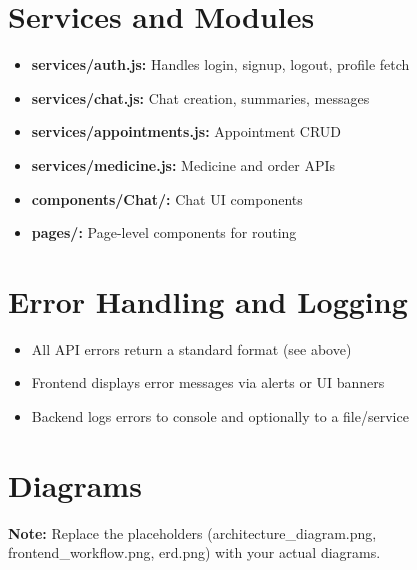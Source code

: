 \documentclass{article}
\begin{document}
\section{Services and Modules}
\begin{itemize}
  \item \textbf{services/auth.js:} Handles login, signup, logout, profile fetch
  \item \textbf{services/chat.js:} Chat creation, summaries, messages
  \item \textbf{services/appointments.js:} Appointment CRUD
  \item \textbf{services/medicine.js:} Medicine and order APIs
  \item \textbf{components/Chat/:} Chat UI components
  \item \textbf{pages/:} Page-level components for routing
\end{itemize}

\section{Error Handling and Logging}
\begin{itemize}
  \item All API errors return a standard format (see above)
  \item Frontend displays error messages via alerts or UI banners
  \item Backend logs errors to console and optionally to a file/service
\end{itemize}

\section{Diagrams}
\textbf{Note:} Replace the placeholders (architecture\_diagram.png, frontend\_workflow.png, erd.png) with your actual diagrams.
\end{document}

